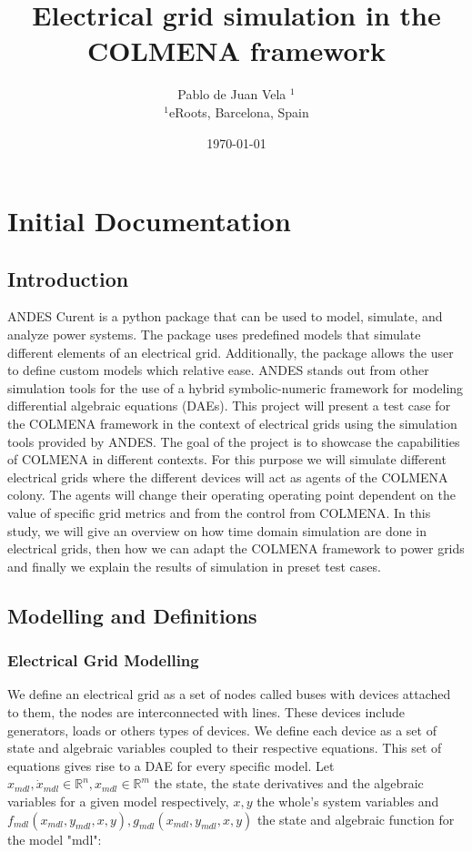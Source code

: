 \documentclass{report}
\title{Electrical grid simulation in the COLMENA framework}
\author{Pablo de Juan Vela $^{1}$ \\
        \small $^{1}$eRoots, Barcelona, Spain \\
}
\date{\today}
\begin{document}
\maketitle

\chapter{Initial Documentation}
%

\section{Introduction}
ANDES Curent \cite{grids:models} is a python package that can be used to model, simulate, and analyze power systems. The package uses predefined models that simulate different elements of an electrical grid. Additionally, the package allows the user to define custom models which relative ease. ANDES stands out from other simulation tools for the use of a hybrid symbolic-numeric framework for modeling differential algebraic equations (DAEs). This project will present a test case for the COLMENA framework in the context of electrical grids using the simulation tools provided by ANDES. The goal of the project is to showcase the capabilities of COLMENA in different contexts. For this purpose we will simulate different electrical grids where the different devices will act as agents of the COLMENA colony. The agents will change their operating operating point dependent on the value of specific grid metrics and from the control from COLMENA. In this study, we will give an overview on how time domain simulation are done in electrical grids, then how we can adapt the COLMENA framework to power grids and finally we explain the results of simulation in preset test cases. 

\section{Modelling and Definitions}

\subsection{Electrical Grid Modelling}

We define an electrical grid as a set of nodes called buses with devices attached to them, the nodes are interconnected with lines. These devices include generators, loads or others types of devices. We define each device as a set of state and algebraic variables coupled to their respective equations. This set of equations gives rise to a DAE for every specific model. Let $x_{mdl}, \dot{x}_{mdl} \in \mathbb{R}^n, x_{mdl} \in \mathbb{R}^m$ the state, the state derivatives and the algebraic variables for a given model respectively, $x, y$ the whole's system variables and $f_{mdl}(x_{mdl}, y_{mdl}, x, y), g_{mdl}(x_{mdl}, y_{mdl}, x, y)$ the state and algebraic function for the model "mdl":
\end{document}

